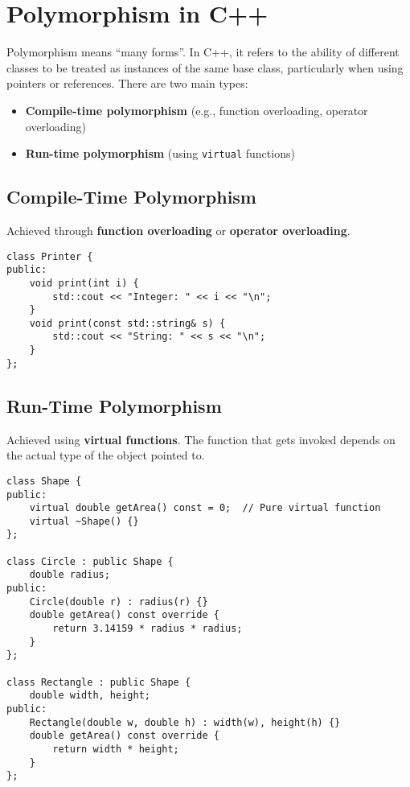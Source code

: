 \documentclass{article}
\begin{document}
\section{Polymorphism in C++}

Polymorphism means ``many forms''. In C++, it refers to the ability of different classes to be treated as instances of the same base class, particularly when using pointers or references. There are two main types:

\begin{itemize}
    \item \textbf{Compile-time polymorphism} (e.g., function overloading, operator overloading)
    \item \textbf{Run-time polymorphism} (using \texttt{virtual} functions)
\end{itemize}

\subsection{Compile-Time Polymorphism}

Achieved through \textbf{function overloading} or \textbf{operator overloading}.

\begin{lstlisting}[style=cppstyle]
class Printer {
public:
    void print(int i) {
        std::cout << "Integer: " << i << "\n";
    }
    void print(const std::string& s) {
        std::cout << "String: " << s << "\n";
    }
};
\end{lstlisting}

\subsection{Run-Time Polymorphism}

Achieved using \textbf{virtual functions}. The function that gets invoked depends on the actual type of the object pointed to.

\begin{lstlisting}
class Shape {
public:
    virtual double getArea() const = 0;  // Pure virtual function
    virtual ~Shape() {}
};

class Circle : public Shape {
    double radius;
public:
    Circle(double r) : radius(r) {}
    double getArea() const override {
        return 3.14159 * radius * radius;
    }
};

class Rectangle : public Shape {
    double width, height;
public:
    Rectangle(double w, double h) : width(w), height(h) {}
    double getArea() const override {
        return width * height;
    }
};
\end{lstlisting}
\end{document}
